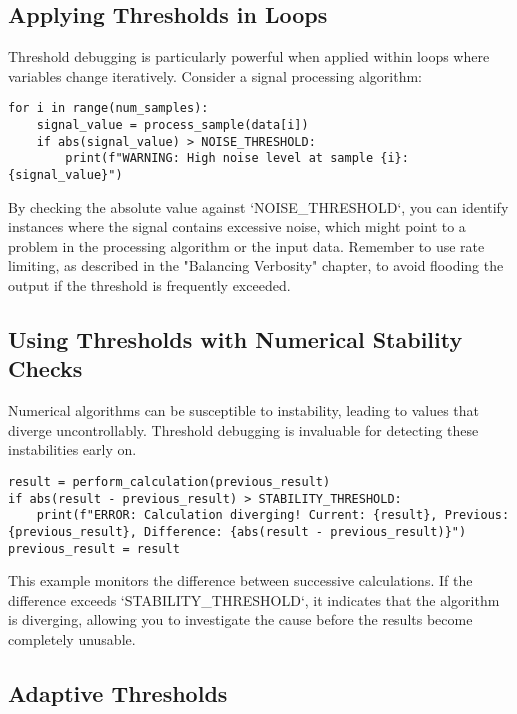\documentclass{article}
\begin{document}
{{{\subsection*{Applying Thresholds in Loops}

Threshold debugging is particularly powerful when applied within loops where variables change iteratively. Consider a signal processing algorithm:

\begin{verbatim}
for i in range(num_samples):
    signal_value = process_sample(data[i])
    if abs(signal_value) > NOISE_THRESHOLD:
        print(f"WARNING: High noise level at sample {i}: {signal_value}")
\end{verbatim}

By checking the absolute value against `NOISE_THRESHOLD`, you can identify instances where the signal contains excessive noise, which might point to a problem in the processing algorithm or the input data.  Remember to use rate limiting, as described in the "Balancing Verbosity" chapter, to avoid flooding the output if the threshold is frequently exceeded.

\subsection*{Using Thresholds with Numerical Stability Checks}

Numerical algorithms can be susceptible to instability, leading to values that diverge uncontrollably. Threshold debugging is invaluable for detecting these instabilities early on.

\begin{verbatim}
result = perform_calculation(previous_result)
if abs(result - previous_result) > STABILITY_THRESHOLD:
    print(f"ERROR: Calculation diverging! Current: {result}, Previous: {previous_result}, Difference: {abs(result - previous_result)}")
previous_result = result
\end{verbatim}

This example monitors the difference between successive calculations. If the difference exceeds `STABILITY_THRESHOLD`, it indicates that the algorithm is diverging, allowing you to investigate the cause before the results become completely unusable.

\subsection*{Adaptive Thresholds}

}}}
\end{document}
